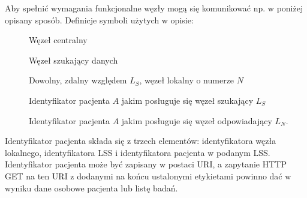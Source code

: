 \documentclass[a4paper]{report}
\begin{document}
Aby spełnić wymagania funkcjonalne węzły mogą się komunikować np. w poniżej opisany sposób.
Definicje symboli użytych w opisie:
\begin{description}
  \item[] Węzeł centralny
  \item[] Węzeł szukający danych
  \item[] Dowolny, zdalny względem $L_S$, węzeł lokalny o numerze $N$
  \item[] Identyfikator pacjenta $A$ jakim posługuje się węzeł szukający $L_S$
  \item[] Identyfikator pacjenta $A$ jakim posługuje się węzeł odpowiadający $L_N$.
\end{description}

Identyfikator pacjenta składa się z trzech elementów: identyfikatora węzła lokalnego, identyfikatora LSS i identyfikatora
pacjenta w podanym LSS. Identyfikator pacjenta może być zapisany w postaci URI, a zapytanie HTTP GET na
ten URI z dodanymi na końcu ustalonymi etykietami powinno dać w wyniku dane osobowe pacjenta lub listę badań.
  
\end{document}
